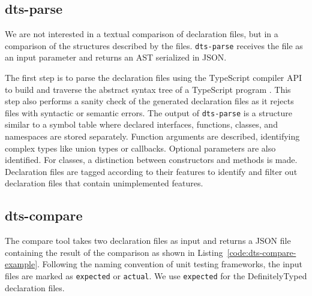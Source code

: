 \documentclass[sigplan,screen]{acmart}
\newcommand{\coderef}[1]{Listing~\ref{#1}}
\begin{document}
\subsection{dts-parse}
\label{sec:dts-parse}

We are not interested in a textual comparison of declaration files, but in a
comparison of the structures described by the
files. \texttt{dts-parse} receives the file as an input
parameter and returns an AST serialized in JSON.

The first step is to parse the declaration files using the TypeScript
compiler API to build and traverse the 
abstract syntax tree of a TypeScript program
\cite{typescript-compiler-api}. 
This step also performs a sanity check of the generated declaration
files as it rejects files with syntactic or semantic errors.
The output of \texttt{dts-parse} is a structure similar to a symbol table where declared
{interfaces}, {functions}, {classes}, and
{namespaces} are stored separately. Function arguments are
described, identifying complex types like union types or
callbacks. Optional parameters are also identified. For
{classes}, a distinction between constructors and methods
is made. Declaration files are tagged according to their features to identify and filter out declaration files
that contain unimplemented features.



\subsection{dts-compare}
\label{sec:dts-compare}

The compare tool takes two declaration files as input and returns a
JSON file containing the result of the comparison as shown in
\coderef{code:dts-compare-example}. Following the naming convention of unit
testing frameworks, the input files are marked as \lstinline{expected} or
\lstinline{actual}. We use \lstinline{expected} for the DefinitelyTyped
declaration files. 
\end{document}
